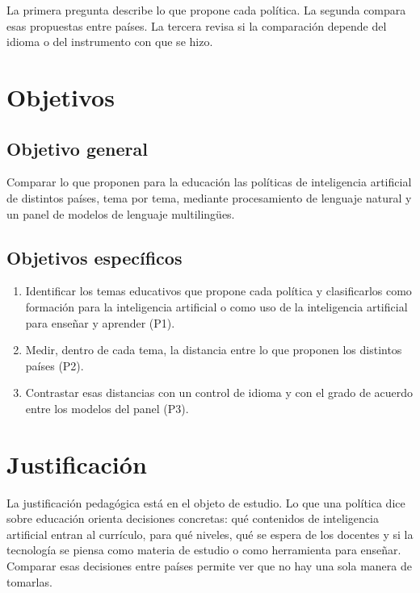La primera pregunta describe lo que propone cada política. La segunda compara esas
propuestas entre países. La tercera revisa si la comparación depende del idioma o del
instrumento con que se hizo.

\section{Objetivos}
\label{sec:objetivos}

\subsection{Objetivo general}

Comparar lo que proponen para la educación las políticas de inteligencia artificial de
distintos países, tema por tema, mediante procesamiento de lenguaje natural y un panel de
modelos de lenguaje multilingües.

\subsection{Objetivos específicos}

\begin{enumerate}
  \item[\textbf{OE1.}] Identificar los temas educativos que propone cada política y
  clasificarlos como formación para la inteligencia artificial o como uso de la
  inteligencia artificial para enseñar y aprender (P1).
  \item[\textbf{OE2.}] Medir, dentro de cada tema, la distancia entre lo que proponen los
  distintos países (P2).
  \item[\textbf{OE3.}] Contrastar esas distancias con un control de idioma y con el grado de
  acuerdo entre los modelos del panel (P3).
\end{enumerate}

\section{Justificación}
\label{sec:justificacion}

La justificación pedagógica está en el objeto de estudio. Lo que una política dice sobre
educación orienta decisiones concretas: qué contenidos de inteligencia artificial entran al
currículo, para qué niveles, qué se espera de los docentes y si la tecnología se piensa
como materia de estudio o como herramienta para enseñar. Comparar esas decisiones entre
países permite ver que no hay una sola manera de tomarlas.

